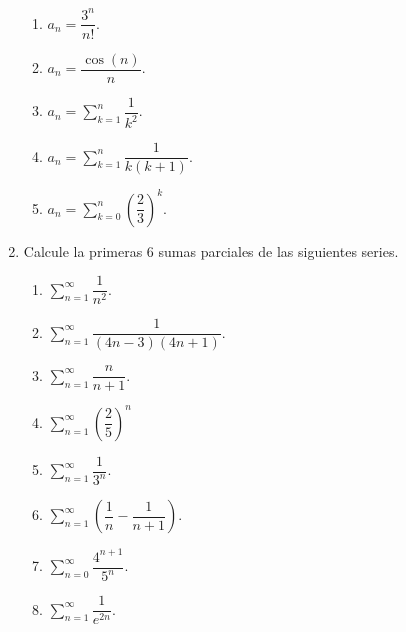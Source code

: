 \begin{enumerate}
\begin{enumerate}
\item $a_{n}=\dfrac{3^{n}}{n!}.$

\item $a_{n}=\dfrac{\cos\left(  n\right)  }{n}.$

\item $a_{n}=%
{\displaystyle\sum\limits_{k=1}^{n}}
\dfrac{1}{k^{2}}.$

\item $a_{n}=%
{\displaystyle\sum\limits_{k=1}^{n}}
\dfrac{1}{k\left(  k+1\right)  }.$

\item $a_{n}=%
{\displaystyle\sum\limits_{k=0}^{n}}
\left(  \dfrac{2}{3}\right)  ^{k}.$
\end{enumerate}

\item Calcule la primeras 6 sumas parciales de las siguientes series.

\begin{enumerate}
\item $%
{\displaystyle\sum\limits_{n=1}^{\infty}}
\dfrac{1}{n^{2}}.$

\item $%
{\displaystyle\sum\limits_{n=1}^{\infty}}
\dfrac{1}{\left(  4n-3\right)  \left(  4n+1\right)  }.$

\item $%
{\displaystyle\sum\limits_{n=1}^{\infty}}
\dfrac{n}{n+1}.$

\item $%
{\displaystyle\sum\limits_{n=1}^{\infty}}
\left(  \dfrac{2}{5}\right)  ^{n}$

\item $%
{\displaystyle\sum\limits_{n=1}^{\infty}}
\dfrac{1}{3^{n}}.$

\item $%
{\displaystyle\sum\limits_{n=1}^{\infty}}
\left(  \dfrac{1}{n}-\dfrac{1}{n+1}\right)  .$

\item $%
{\displaystyle\sum\limits_{n=0}^{\infty}}
\dfrac{4^{n+1}}{5^{n}}.$

\item $%
{\displaystyle\sum\limits_{n=1}^{\infty}}
\dfrac{1}{e^{2n}}.$
\end{enumerate}
\end{enumerate}

